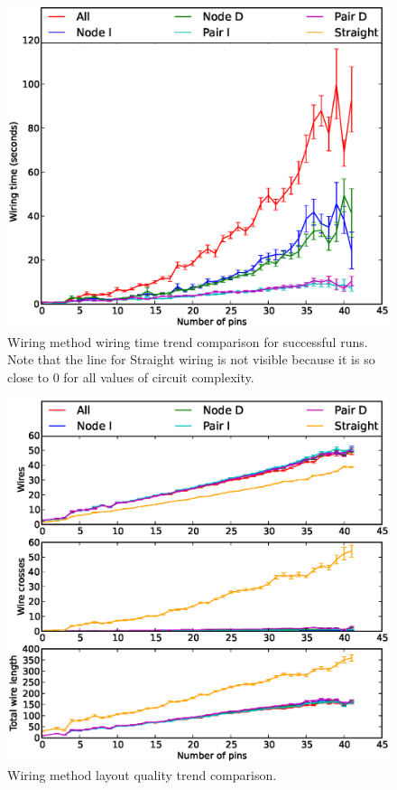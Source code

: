 \begin{figure}
\begin{center}
\includegraphics[width=\textwidth]{Images/wiring_time_trend_comparison.eps}
\caption[Wiring method wiring time trend comparison]{Wiring method wiring time
trend comparison for successful runs. Note that the line for Straight wiring is
not visible because it is so close to $0$ for all values of circuit complexity.}
\label{fig:wiring_time_trend}
\end{center}
\end{figure}

\begin{figure}
\begin{center}
\includegraphics[width=\textwidth]{Images/wiring_quality_trend_comparison.eps}
\caption[Wiring method layout quality trend comparison]{Wiring method layout
quality trend comparison.}
\label{fig:wiring_quality_trend}
\end{center}
\end{figure}

